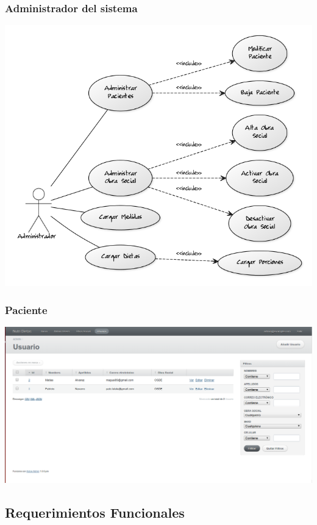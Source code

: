 \documentclass[runningheads,a4paper,spanish]{llncs}
\begin{document}
\subsubsection{Administrador del sistema}
\begin{center}
	\includegraphics[scale=0.50]{Administrador}
\end{center}

\subsubsection{Paciente}
\begin{center}
	\includegraphics[scale=0.50]{Paciente}
\end{center}
\subsection{Requerimientos Funcionales}
\end{document}
